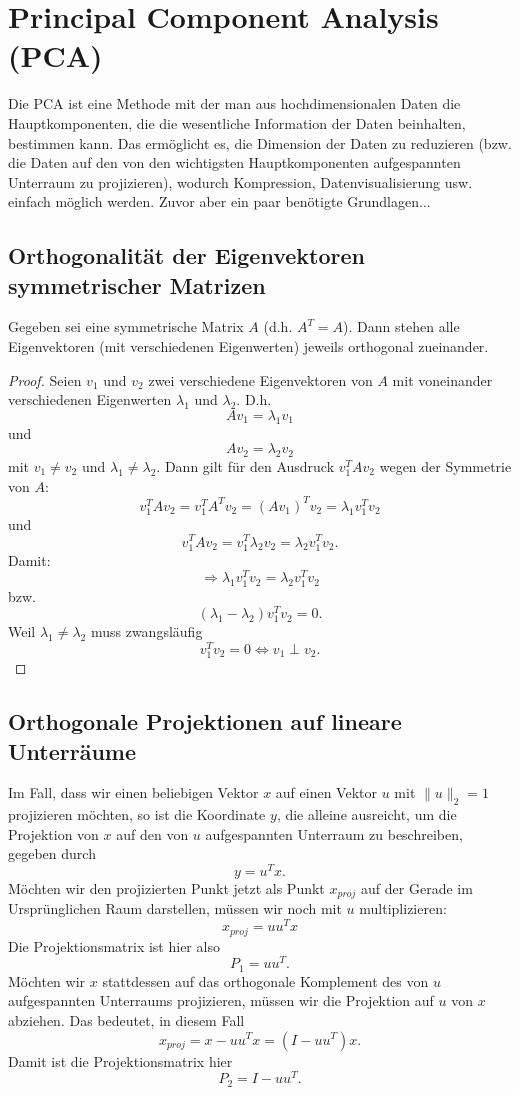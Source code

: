 \documentclass{article}
\begin{document}
\section{Principal Component Analysis (PCA)}
Die PCA ist eine Methode mit der man aus hochdimensionalen Daten die Hauptkomponenten, die die wesentliche Information der Daten beinhalten, bestimmen kann. Das ermöglicht es, die Dimension der Daten zu reduzieren (bzw. die Daten auf den von den wichtigsten Hauptkomponenten aufgespannten Unterraum zu projizieren), wodurch Kompression, Datenvisualisierung usw. einfach möglich werden. Zuvor aber ein paar benötigte Grundlagen...

\subsection{Orthogonalität der Eigenvektoren symmetrischer Matrizen}\label{eig_orth_thrm}
Gegeben sei eine symmetrische Matrix \(A\) (d.h. \(A^T=A\)). Dann stehen alle Eigenvektoren (mit verschiedenen Eigenwerten) jeweils orthogonal zueinander.
\begin{proof}
    Seien \(v_1\) und \(v_2\) zwei verschiedene Eigenvektoren von \(A\) mit voneinander verschiedenen Eigenwerten \(\lambda_1\) und \(\lambda_2\). D.h.\[
    Av_1=\lambda_1v_1
    \]und\[
    Av_2=\lambda_2v_2
    \]mit \(v_1\neq v_2\) und \(\lambda_1\neq\lambda_2\). Dann gilt für den Ausdruck \(v_1^TAv_2\) wegen der Symmetrie von \(A\):\[
    v_1^TAv_2=v_1^TA^Tv_2=(Av_1)^Tv_2=\lambda_1v_1^Tv_2
    \]und\[
    v_1^TAv_2=v_1^T\lambda_2v_2=\lambda_2v_1^Tv_2.
    \]Damit:\[
    \Longrightarrow\lambda_1v_1^Tv_2=\lambda_2v_1^Tv_2
    \]bzw.\[
    (\lambda_1-\lambda_2)v_1^Tv_2=0.
    \]Weil \(\lambda_1\neq\lambda_2\) muss zwangsläufig\[
    v_1^Tv_2=0\iff v_1\perp v_2.
    \]
\end{proof}

\subsection{Orthogonale Projektionen auf lineare Unterräume}\label{proj}
Im Fall, dass wir einen beliebigen Vektor \(x\) auf einen Vektor \(u\) mit \(\|u\|_2=1\) projizieren möchten, so ist die Koordinate \(y\), die alleine ausreicht, um die Projektion von \(x\) auf den von \(u\) aufgespannten Unterraum zu beschreiben, gegeben durch\[
y=u^Tx.
\]Möchten wir den projizierten Punkt jetzt als Punkt \(x_{proj}\) auf der Gerade im Ursprünglichen Raum darstellen, müssen wir noch mit \(u\) multiplizieren:\[
x_{proj}=uu^Tx
\]Die Projektionsmatrix ist hier also \[
P_1=uu^T.
\]Möchten wir \(x\) stattdessen auf das orthogonale Komplement des von \(u\) aufgespannten Unterraums projizieren, müssen wir die Projektion auf \(u\) von \(x\) abziehen. Das bedeutet, in diesem Fall\[
x_{proj}=x-uu^Tx=(I-uu^T)x.
\]Damit ist die Projektionsmatrix hier\[
P_2=I-uu^T.
\]
\end{document}
